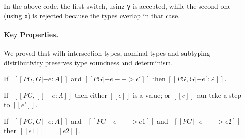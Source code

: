 \noindent In the above code, the first switch, using \lstinline{y} is accepted, while
the second one (using \lstinline{x}) is rejected because the types overlap in that case.


\paragraph{Key Properties.}
We proved that \name with intersection types, nominal types
and subtyping distributivity
preserves type soundness and determinism.

\begin{comment}
\begin{figure}[t]
  \begin{small}
    \centering
    \drules[typ]{$ [[G |- e : A]] $}{Additional typing rule for intersection types}{and}
  \end{small}
  \caption{Additional typing rule for \name with intersection types.}
  \label{fig:inter:typ}
\end{figure}
\end{comment}


\begin{theorem}
\label{lemma:inter:preservation}
  If \ $[[PG , G |- e : A]]$ and $[[PG |- e --> e']]$ then $[[PG , G |- e' : A]]$.
\end{theorem}

\begin{theorem}[Progress]
\label{lemma:inter:progress}
If \ $[[PG , [] |- e : A]]$ then either $[[e]]$ is a value;
or $[[e]]$ can take a step to $[[e']]$.
\end{theorem}

\begin{theorem}[Determinism]
\label{lemma:inter:determinism}
  If \ $[[PG , G |- e : A]]$ and \ $[[PG |- e --> e1]]$ and \ $[[PG |- e --> e2]]$ then $[[e1]]$ = $[[e2]]$.
\end{theorem}




